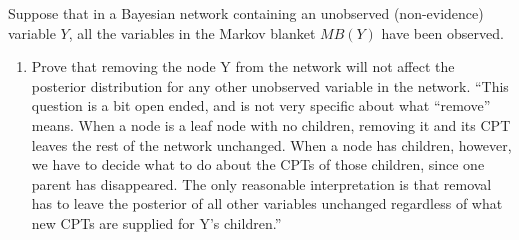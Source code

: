 \documentclass[12pt]{article}
\newenvironment{problem}[2][Problem]{\begin{trivlist}
\item[\hskip \labelsep {\bfseries #1}\hskip \labelsep {\bfseries #2.}]}{\end{trivlist}}
\begin{document}
\begin{problem}{5}
	Suppose that in a Bayesian network containing an unobserved (non-evidence) variable $Y$,
	all the variables in the Markov blanket $MB(Y)$ have been observed.
	\begin{enumerate}
		\item Prove that removing the node Y from the network will not affect the posterior distribution
			for any other unobserved variable in the network.
			``This question is a bit open ended, and is not very specific about what “remove” means.
			When a node is a leaf node with no children, removing it and its CPT leaves the rest of the network unchanged.
			When a node has children, however, we have to decide what to do about the CPTs of those children,
			since one parent has disappeared.
			The only reasonable interpretation is that removal has to leave the posterior of all other variables unchanged
			regardless of what new CPTs are supplied for Y's children.''


\end{enumerate}
\end{problem}
\end{document}
